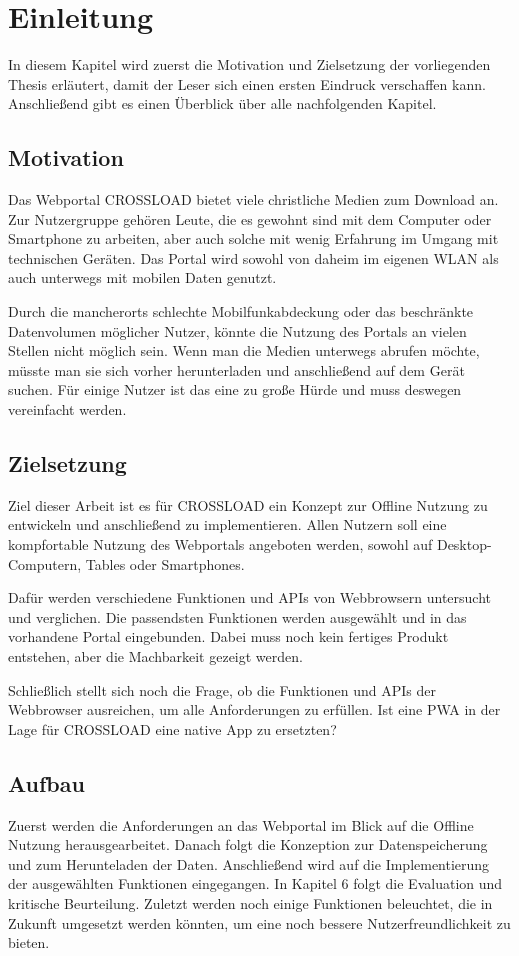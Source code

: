 \chapter{Einleitung}
\label{Kap1}

In diesem Kapitel wird zuerst die Motivation und Zielsetzung der vorliegenden Thesis erläutert, damit der Leser sich einen ersten Eindruck verschaffen kann. Anschließend gibt es einen Überblick über alle nachfolgenden Kapitel.


\section{Motivation}
Das Webportal CROSSLOAD bietet viele christliche Medien zum Download an. Zur Nutzergruppe gehören Leute, die es gewohnt sind mit dem Computer oder Smartphone zu arbeiten, aber auch solche mit wenig Erfahrung im Umgang mit technischen Geräten. Das Portal wird sowohl von daheim im eigenen WLAN als auch unterwegs mit mobilen Daten genutzt.

Durch die mancherorts schlechte Mobilfunkabdeckung oder das beschränkte
Datenvolumen möglicher Nutzer, könnte die Nutzung des Portals an vielen Stellen nicht
möglich sein. Wenn man die Medien unterwegs abrufen möchte, müsste man sie sich
vorher herunterladen und anschließend auf dem Gerät suchen. Für einige Nutzer ist das
eine zu große Hürde und muss deswegen vereinfacht werden. 

\section{Zielsetzung}
Ziel dieser Arbeit ist es für CROSSLOAD ein Konzept zur Offline Nutzung zu entwickeln und anschließend zu implementieren. Allen Nutzern soll eine kompfortable Nutzung des Webportals angeboten werden, sowohl auf Desktop-Computern, Tables oder Smartphones. 

Dafür werden verschiedene Funktionen und \acp{API} von Webbrowsern untersucht und verglichen. Die passendsten Funktionen werden ausgewählt und in das vorhandene Portal eingebunden. Dabei muss noch kein fertiges Produkt entstehen, aber die Machbarkeit gezeigt werden. 

Schließlich stellt sich noch die Frage, ob die Funktionen und APIs der Webbrowser ausreichen, um alle Anforderungen zu erfüllen. Ist eine \ac{PWA} in der Lage für CROSSLOAD eine native App zu ersetzten?

\section{Aufbau}
Zuerst werden die Anforderungen an das Webportal im Blick auf die Offline Nutzung herausgearbeitet. Danach folgt die Konzeption zur Datenspeicherung und zum Herunteladen der Daten. Anschließend wird auf die Implementierung der ausgewählten Funktionen eingegangen. In Kapitel 6 folgt die Evaluation und kritische Beurteilung. Zuletzt werden noch einige Funktionen beleuchtet, die in Zukunft umgesetzt werden könnten, um eine noch bessere Nutzerfreundlichkeit zu bieten.
